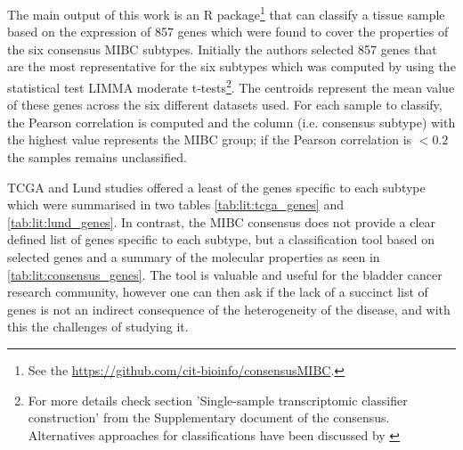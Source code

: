 The main output of this work is an R package\footnote{See the \url{https://github.com/cit-bioinfo/consensusMIBC}.} that can classify a tissue sample based on the expression of 857 genes which were found to cover the properties of the six consensus MIBC subtypes. Initially the authors selected 857 genes that are the most representative for the six subtypes which was computed by using the statistical test LIMMA moderate t-tests\footnote{For more details check section 'Single-sample transcriptomic classifier construction' from the Supplementary document of the consensus. Alternatives approaches for classifications have been discussed by \citet{Eriksson2022-vw}}. The centroids represent the mean value of these genes across the six different datasets used. For each sample to classify, the Pearson correlation is computed and the column (i.e. consensus subtype) with the highest value represents the MIBC group; if the Pearson correlation is $<0.2$ the samples remains unclassified. 


TCGA and Lund studies offered a least of the genes specific to each subtype which were summarised in two tables \cref{tab:lit:tcga_genes} and \cref{tab:lit:lund_genes}. In contrast, the MIBC consensus does not provide a clear defined list of genes specific to each subtype, but a classification tool based on selected genes and a summary of the molecular properties as seen in \cref{tab:lit:consensus_genes}. The tool is valuable and useful for the bladder cancer research community, however one can then ask if the lack of a succinct list of genes is not an indirect consequence of the heterogeneity of the disease, and with this the challenges of studying it. 

